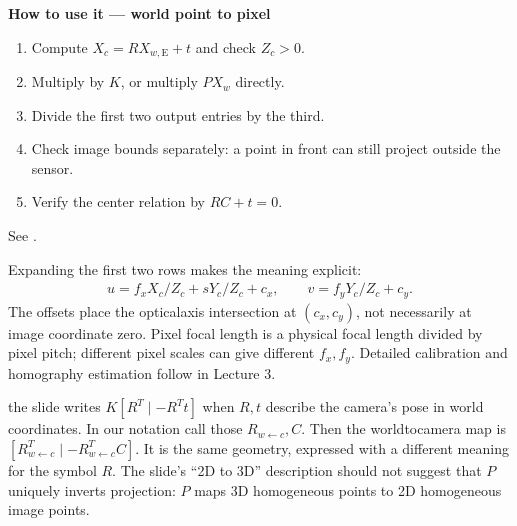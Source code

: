 \documentclass[letterpaper,11pt,english,openany,oneside]{jupyterBook}
\begin{document}
\begin{TextbookBox}
\textbf{How to use it — world point to pixel}\par\smallskip
\begin{enumerate}
%
\item {}
\sphinxAtStartPar
Compute \(X_c=RX_{w,\mathrm{E}}+t\) and check \(Z_c>0\).

\item {}
\sphinxAtStartPar
Multiply by \(K\), or multiply \(PX_w\) directly.

\item {}
\sphinxAtStartPar
Divide the first two output entries by the third.

\item {}
\sphinxAtStartPar
Check image bounds separately: a point in front can still project outside the sensor.

\item {}
\sphinxAtStartPar
Verify the center relation by \(RC+t=0\).

\end{enumerate}

\sphinxAtStartPar
See {\hyperref[\detokenize{lectures/lecture01/cameras:ex-lec01-camera-motion}]{}}.

\end{TextbookBox}

\sphinxAtStartPar
Expanding the first two rows makes the meaning explicit:
\begin{equation*}
\begin{split}u=f_xX_c/Z_c+sY_c/Z_c+c_x,\qquad v=f_yY_c/Z_c+c_y.\end{split}
\end{equation*}
\sphinxAtStartPar
The offsets place the optical\sphinxhyphen{}axis intersection at \((c_x,c_y)\), not necessarily at image coordinate zero. Pixel focal length is a physical focal length divided by pixel pitch; different pixel scales can give different \(f_x,f_y\). Detailed calibration and homography estimation follow in Lecture 3.

\sphinxAtStartPar
{} the slide writes \(K[R^T\mid -R^Tt]\) when \(R,t\) describe the camera’s pose in world coordinates. In our notation call those \(R_{w\leftarrow c},C\). Then the world\sphinxhyphen{}to\sphinxhyphen{}camera map is \([R_{w\leftarrow c}^T\mid-R_{w\leftarrow c}^TC]\). It is the same geometry, expressed with a different meaning for the symbol \(R\). The slide’s “2\sphinxhyphen{}D to 3\sphinxhyphen{}D” description should not suggest that \(P\) uniquely inverts projection: \(P\) maps 3D homogeneous points to 2D homogeneous image points.
\end{document}
